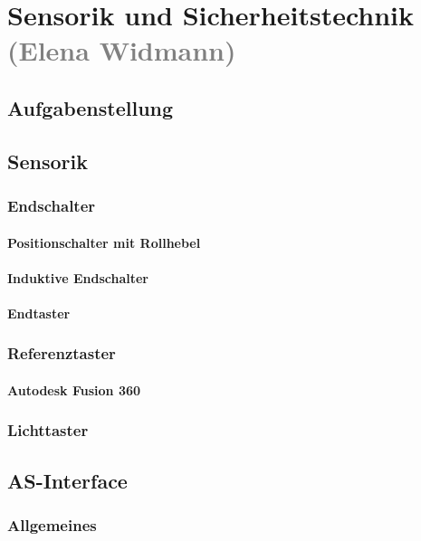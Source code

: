 \section{Sensorik und Sicherheitstechnik \textcolor{gray}{(Elena Widmann)}}

\subsection{Aufgabenstellung}

\subsection{Sensorik}

\subsubsection{Endschalter}
\paragraph{Positionschalter mit Rollhebel}
\paragraph{Induktive Endschalter}
\paragraph{Endtaster}

\subsubsection{Referenztaster}
\paragraph{Autodesk Fusion 360}

\subsubsection{Lichttaster}

\subsection{AS-Interface}

\subsubsection{Allgemeines}

